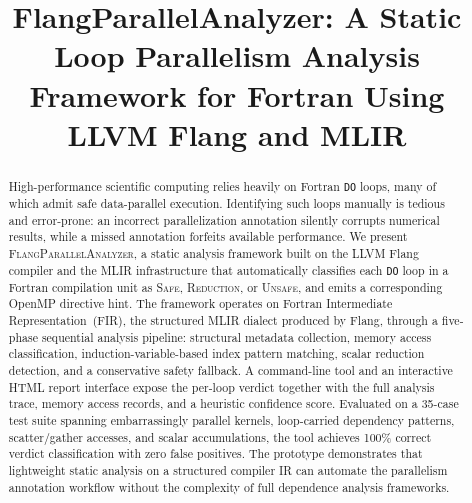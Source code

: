 \documentclass[conference]{IEEEtran}
\begin{document}
\title{FlangParallelAnalyzer: A Static Loop Parallelism Analysis\\
       Framework for Fortran Using LLVM Flang and MLIR}

\author{
  \and
  \and
}

\maketitle

\begin{abstract}
High-performance scientific computing relies heavily on Fortran
\texttt{DO} loops, many of which admit safe data-parallel execution.
Identifying such loops manually is tedious and error-prone: an incorrect
parallelization annotation silently corrupts numerical results, while a
missed annotation forfeits available performance.
We present \textsc{FlangParallelAnalyzer}, a static analysis framework
built on the LLVM Flang compiler and the MLIR infrastructure that
automatically classifies each \texttt{DO} loop in a Fortran compilation
unit as \textsc{Safe}, \textsc{Reduction}, or \textsc{Unsafe}, and
emits a corresponding OpenMP directive hint.
The framework operates on Fortran Intermediate Representation~(FIR),
the structured MLIR dialect produced by Flang, through a five-phase
sequential analysis pipeline: structural metadata collection, memory
access classification, induction-variable-based index pattern matching,
scalar reduction detection, and a conservative safety fallback.
A command-line tool and an interactive HTML report interface expose
the per-loop verdict together with the full analysis trace, memory
access records, and a heuristic confidence score.
Evaluated on a 35-case test suite spanning embarrassingly parallel
kernels, loop-carried dependency patterns, scatter/gather accesses,
and scalar accumulations, the tool achieves 100\% correct verdict
classification with zero false positives.
The prototype demonstrates that lightweight static analysis on a
structured compiler IR can automate the parallelism annotation
workflow without the complexity of full dependence analysis frameworks.
\end{abstract}
\end{document}
